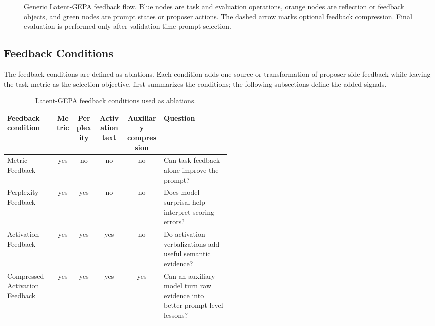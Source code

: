 \documentclass[12pt,a4paper,twoside,openright]{book}
\begin{document}
\begin{figure}[!htb]
{}
    \caption{Generic Latent-GEPA feedback flow. Blue nodes are task and
    evaluation operations, orange nodes are reflection or feedback objects, and
    green nodes are prompt states or proposer actions. The dashed arrow marks
    optional feedback compression. Final evaluation is performed only after
    validation-time prompt selection.}
    \label{fig:latent-gepa-feedback-flow}
\end{figure}

\subsection{Feedback Conditions}
\label{sec:method-feedback-conditions}

The feedback conditions are defined as ablations. Each condition adds one source
or transformation of proposer-side feedback while leaving the task metric as the
selection objective.  first summarizes the
conditions; the following subsections define the added signals.

\begin{table}[!htb]
    \centering
    \small
    \begin{adjustbox}{width=\textwidth}
    \begin{tabular}{p{0.22\linewidth} c c c c p{0.30\linewidth}}
        \toprule
        \textbf{Feedback condition} & \textbf{Metric} & \textbf{Perplexity} & \textbf{Activation text} & \textbf{Auxiliary compression} & \textbf{Question} \\
        \midrule
        Metric Feedback & yes & no & no & no &
        Can task feedback alone improve the prompt? \\
        Perplexity Feedback & yes & yes & no & no &
        Does model surprisal help interpret scoring errors? \\
        Activation Feedback & yes & yes & yes & no &
        Do activation verbalizations add useful semantic evidence? \\
        Compressed Activation Feedback & yes & yes & yes & yes &
        Can an auxiliary model turn raw evidence into better prompt-level lessons? \\
        \bottomrule
    \end{tabular}
    \end{adjustbox}
    \caption{Latent-GEPA feedback conditions used as ablations.}
    \label{tab:feedback-conditions}
\end{table}
\end{document}
